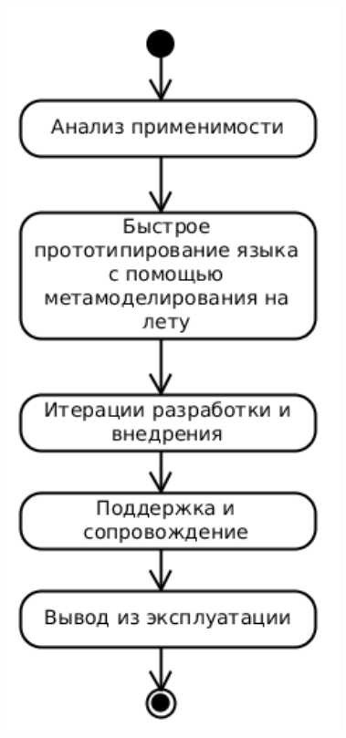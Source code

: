 \documentclass[14pt]{beamer}
\begin{document}
\begin{frame}
\begin{columns}[onlytextwidth]
\begin{column}{0.3\textwidth}
\begin{figure}
\begin{center}
{                		\includegraphics[width=0.9\textwidth]{images/presentation/metamodelingOnFly.png}
                    }
            	\end{center}
            \end{figure}
       \end{column}
​  \end{columns}
\end{frame}
\end{document}
